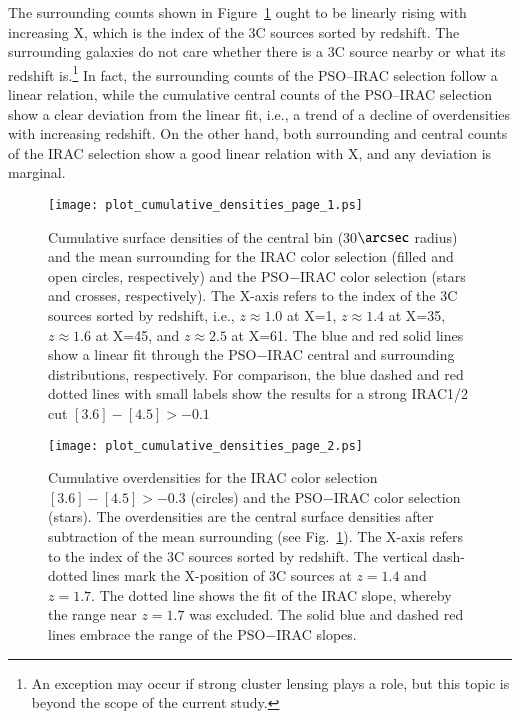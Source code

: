 \documentclass[mathleft,fleqn,%
]{an}
\begin{document}
The surrounding counts shown in Figure~\ref{fig_cumulative_densities}  
ought to be linearly rising with increasing X, which is the index of the
3C sources sorted by redshift.  The surrounding
galaxies do not care whether there is a 3C source nearby or what its
redshift is.\footnote{An exception may occur if strong cluster lensing
plays a role, but this topic is beyond the scope of the current study.} 
In fact, the surrounding counts of the PSO--IRAC selection follow a
linear relation, while the cumulative central counts of the PSO--IRAC selection
show a clear deviation from the linear fit, i.e., a trend of a decline
of overdensities with increasing redshift.
On the other hand, both surrounding and central counts of the IRAC
selection show a good linear relation with X, and any
deviation is marginal. 


\begin{figure}
  \texttt{[image: plot\_cumulative\_densities\_page\_1.ps]}
  \caption{Cumulative surface densities
    of the central bin (30$\arcsec$
    radius) and the mean surrounding 
    for the IRAC color selection (filled and open
    circles, respectively)
    and the  PSO$-$IRAC color selection  (stars and crosses, respectively).
    The X-axis refers to the index of the 3C sources sorted by
    redshift, i.e., $z\approx1.0$ at X=1, $z\approx1.4$ at X=35, $z\approx1.6$ at X=45, and $z\approx2.5$ at X=61.
    The blue and red solid lines show a linear fit through the PSO$-$IRAC
    central and surrounding distributions, respectively.
    For comparison, 
    the blue dashed and red dotted lines with small labels show the
    results for a strong IRAC1/2 cut  $[3.6] - [4.5] > -0.1$
  }
  \label{fig_cumulative_densities}
\end{figure}

\begin{figure}
  \texttt{[image: plot\_cumulative\_densities\_page\_2.ps]}
  \caption{Cumulative overdensities
    for the IRAC color selection $[3.6] - [4.5] > -0.3$ (circles)
    and the PSO$-$IRAC color selection (stars).
    The overdensities are the central surface densities  
    after subtraction of the mean surrounding (see Fig.~\ref{fig_cumulative_densities}).
    The X-axis refers to the index of the 3C sources sorted by
    redshift.
    The vertical dash-dotted lines mark the X-position of 3C sources at
    $z=1.4$ and $z=1.7$.
    The dotted line shows the fit of the IRAC slope, whereby  the
    range near $z=1.7$ was excluded. 
    The solid blue and dashed red lines embrace the range of the PSO$-$IRAC slopes.
  }
  \label{fig_cumulative_densities_2}
\end{figure}
\end{document}
